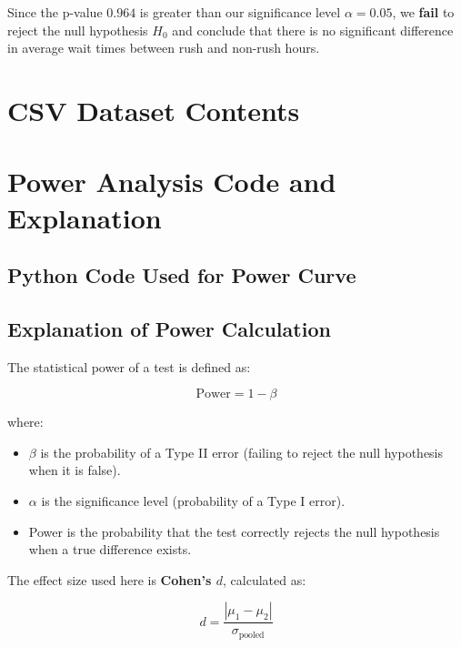 \documentclass[a4paper, 10pt]{article}
\begin{document}
			\vspace{1mm}
			\noindent Since the p-value \( 0.964 \) is greater than our significance level \( \alpha = 0.05 \), 
			we \textbf{fail} to reject the null hypothesis $H_0$ and conclude that there is no significant difference in average
			wait times between rush and non-rush hours.
	\begin{appendices}
		\section{CSV Dataset Contents}
		\label{sec:rawdata}
		

		\newpage
		\section{Power Analysis Code and Explanation}
		\label{sec:power_analysis}

		\subsection*{Python Code Used for Power Curve}
				

			\subsection*{Explanation of Power Calculation}

				The statistical power of a test is defined as:

				\[
				\text{Power} = 1 - \beta
				\]

				where:
				\begin{itemize}
						\item \( \beta \) is the probability of a Type II error (failing to reject the null hypothesis when it is false).
						\item \( \alpha \) is the significance level (probability of a Type I error).
						\item Power is the probability that the test correctly rejects the null hypothesis when a true difference exists.
				\end{itemize}

				The effect size used here is \textbf{Cohen's \( d \)}, calculated as:

				\[
				d = \frac{|\mu_1 - \mu_2|}{\sigma_{\text{pooled}}}
				\]


\end{appendices}
\end{document}
